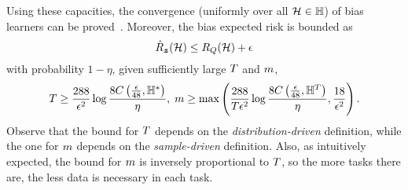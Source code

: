 Using these capacities, the convergence (uniformly over all $\mathcal{H} \in \mathbb{H}$) of bias learners can be proved~\cite[Theorem~2]{baxter2000model}. Moreover, the bias expected risk is bounded as
\begin{equation}
    \nonumber
    \hat{R}_{\bm{z}}(\mathcal{H}) \leq R_Q(\mathcal{H}) + \epsilon
\end{equation}
with probability $1 - \eta$, given sufficiently large $T$ and $m$, 
\begin{equation}
    \nonumber
    T \geq \frac{288}{\epsilon^2} \log{\frac{8C\left(\frac{\epsilon}{48}, \mathbb{H}^{*}\right)}{\eta}} , \; m \geq \max \left( \frac{288}{T \epsilon^2} \log\frac{8C\left(\frac{\epsilon}{48}, \mathbb{H}^{T}\right)}{\eta} , \frac{18}{\epsilon^2}\right) .
\end{equation}
Observe that the bound for $T$ depends on the \emph{distribution-driven} definition, while the one for $m$ depends on the \emph{sample-driven} definition.
Also, as intuitively expected, the bound for $m$ is inversely proportional to $T$, so the more tasks there are, the less data is necessary in each task. 

